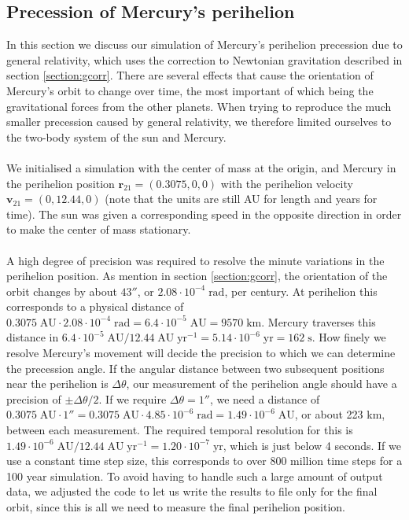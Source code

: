 \documentclass{article}
\newcommand{\mb}[1]{\mathbf{#1}}
\begin{document}
\subsection{Precession of Mercury's perihelion} \label{section:mprec}
In this section we discuss our simulation of Mercury's perihelion precession due to general relativity, which uses the correction to Newtonian gravitation described in section \ref{section:gcorr}. There are several effects that cause the orientation of Mercury's orbit to change over time, the most important of which being the gravitational forces from the other planets. When trying to reproduce the much smaller precession caused by general relativity, we therefore limited ourselves to the two-body system of the sun and Mercury. \\\\
We initialised a simulation with the center of mass at the origin, and Mercury in the perihelion position $\mb{r}_{21} = (0.3075, 0, 0)$ with the perihelion velocity $\mb{v}_{21} = (0, 12.44, 0)$ (note that the units are still AU for length and years for time). The sun was given a corresponding speed in the opposite direction in order to make the center of mass stationary. \\\\
A high degree of precision was required to resolve the minute variations in the perihelion position. As mention in section \ref{section:gcorr}, the orientation of the orbit changes by about $43''$, or $2.08\cdot 10^{-4}\;\text{rad}$, per century. At perihelion this corresponds to a physical distance of $0.3075\;\text{AU}\cdot 2.08\cdot 10^{-4}\;\text{rad} = 6.4\cdot 10^{-5}\;\text{AU} = 9570\;\text{km}$. Mercury traverses this distance in $6.4\cdot 10^{-5}\;\text{AU}/12.44\;\text{AU}\;\text{yr}^{-1} = 5.14\cdot 10^{-6}\;\text{yr} = 162\;\text{s}$. How finely we resolve Mercury's movement will decide the precision to which we can determine the precession angle. If the angular distance between two subsequent positions near the perihelion is $\Delta \theta$, our measurement of the perihelion angle should have a precision of $\pm \Delta \theta/2$. If we require $\Delta \theta = 1''$, we need a distance of $0.3075\;\text{AU}\cdot 1'' = 0.3075\;\text{AU}\cdot 4.85\cdot 10^{-6}\;\text{rad} = 1.49\cdot 10^{-6}\;\text{AU}$, or about 223 km, between each measurement. The required temporal resolution for this is $1.49\cdot 10^{-6}\;\text{AU}/12.44\;\text{AU}\;\text{yr}^{-1} = 1.20\cdot 10^{-7}\;\text{yr}$, which is just below 4 seconds. If we use a constant time step size, this corresponds to over 800 million time steps for a 100 year simulation. To avoid having to handle such a large amount of output data, we adjusted the code to let us write the results to file only for the final orbit, since this is all we need to measure the final perihelion position. \\\\
\end{document}
